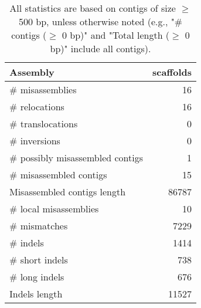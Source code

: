 \documentclass[12pt,a4paper]{article}
\begin{document}
\begin{table}[ht]
\begin{center}
\caption{All statistics are based on contigs of size $\geq$ 500 bp, unless otherwise noted (e.g., "\# contigs ($\geq$ 0 bp)" and "Total length ($\geq$ 0 bp)" include all contigs).}
\begin{tabular}{|l*{1}{|r}|}
\hline
Assembly & scaffolds \\ \hline
\# misassemblies & 16 \\ \hline
\hspace{5mm}\# relocations & 16 \\ \hline
\hspace{5mm}\# translocations & 0 \\ \hline
\hspace{5mm}\# inversions & 0 \\ \hline
\# possibly misassembled contigs & 1 \\ \hline
\# misassembled contigs & 15 \\ \hline
Misassembled contigs length & 86787 \\ \hline
\# local misassemblies & 10 \\ \hline
\# mismatches & 7229 \\ \hline
\# indels & 1414 \\ \hline
\hspace{5mm}\# short indels & 738 \\ \hline
\hspace{5mm}\# long indels & 676 \\ \hline
Indels length & 11527 \\ \hline
\end{tabular}
\end{center}
\end{table}
\end{document}
